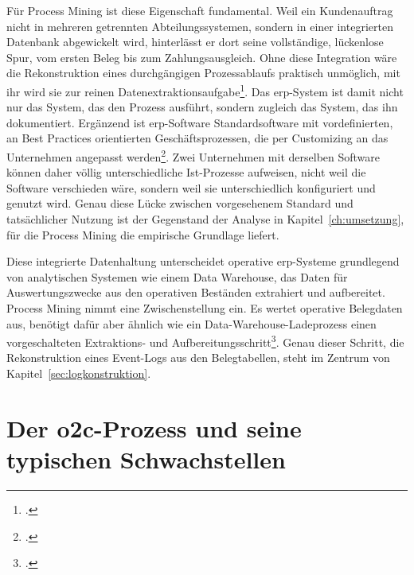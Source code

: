 Für Process Mining ist diese Eigenschaft fundamental. Weil ein Kundenauftrag nicht in mehreren getrennten Abteilungssystemen, sondern in einer integrierten Datenbank abgewickelt wird, hinterlässt er dort seine vollständige, lückenlose Spur, vom ersten Beleg bis zum Zahlungsausgleich. Ohne diese Integration wäre die Rekonstruktion eines durchgängigen Prozessablaufs praktisch unmöglich, mit ihr wird sie zur reinen Datenextraktionsaufgabe\footcite[Vgl.][S.~125 ff.]{vanderaalst2016processmining}. Das \gls{erp}-System ist damit nicht nur das System, das den Prozess ausführt, sondern zugleich das System, das ihn dokumentiert. Ergänzend ist \gls{erp}-Software Standardsoftware mit vordefinierten, an Best Practices orientierten Geschäftsprozessen, die per Customizing an das Unternehmen angepasst werden\footcite[Vgl.][S.~4]{gronau2014erp}. Zwei Unternehmen mit derselben Software können daher völlig unterschiedliche Ist-Prozesse aufweisen, nicht weil die Software verschieden wäre, sondern weil sie unterschiedlich konfiguriert und genutzt wird. Genau diese Lücke zwischen vorgesehenem Standard und tatsächlicher Nutzung ist der Gegenstand der Analyse in Kapitel~\ref{ch:umsetzung}, für die Process Mining die empirische Grundlage liefert.

Diese integrierte Datenhaltung unterscheidet operative \gls{erp}-Systeme grundlegend von analytischen Systemen wie einem Data Warehouse, das Daten für Auswertungszwecke aus den operativen Beständen extrahiert und aufbereitet. Process Mining nimmt eine Zwischenstellung ein. Es wertet operative Belegdaten aus, benötigt dafür aber ähnlich wie ein Data-Warehouse-Ladeprozess einen vorgeschalteten Extraktions- und Aufbereitungsschritt\footcite[Vgl.][S.~125 ff.]{vanderaalst2016processmining}. Genau dieser Schritt, die Rekonstruktion eines Event-Logs aus den Belegtabellen, steht im Zentrum von Kapitel~\ref{sec:logkonstruktion}.

\section{Der \gls{o2c}-Prozess und seine typischen Schwachstellen}\label{sec:o2c-schwachstellen}

